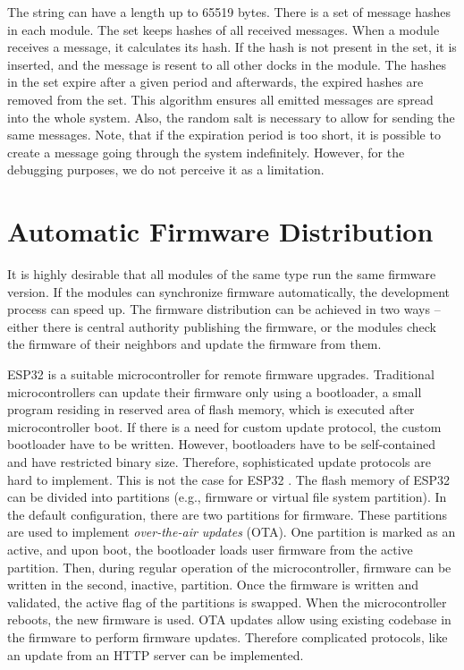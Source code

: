 \noindent The string can have a length up to 65519 bytes. There is a set of
message hashes in each module. The set keeps hashes of all received messages.
When a module receives a message, it calculates its hash. If the hash is not
present in the set, it is inserted, and the message is resent to all other docks
in the module. The hashes in the set expire after a given period and afterwards,
the expired hashes are removed from the set. This algorithm ensures all emitted
messages are spread into the whole system. Also, the random salt is necessary to
allow for sending the same messages. Note, that if the expiration period is too
short, it is possible to create a message going through the system indefinitely.
However, for the debugging purposes, we do not perceive it as a limitation.

\section{Automatic Firmware Distribution} \label{sec:firmware_distribution}

It is highly desirable that all modules of the same type run the same firmware
version. If the modules can synchronize firmware automatically, the development
process can speed up. The firmware distribution can be achieved in two ways --
either there is central authority publishing the firmware, or the modules check
the firmware of their neighbors and update the firmware from them.

ESP32 is a suitable microcontroller for remote firmware upgrades. Traditional
microcontrollers can update their firmware only using a bootloader, a small
program residing in reserved area of flash memory, which is executed after
microcontroller boot. If there is a need for custom update protocol, the custom
bootloader have to be written. However, bootloaders have to be self-contained
and have restricted binary size. Therefore, sophisticated update protocols are
hard to implement. This is not the case for ESP32
\cite{noauthor_esp-idf_nodate}. The flash memory of ESP32 can be divided into
partitions (e.g., firmware or virtual file system partition). In the default
configuration, there are two partitions for firmware. These partitions are used
to implement \emph{over-the-air updates} (OTA). One partition is marked as an
active, and upon boot, the bootloader loads user firmware from the active
partition. Then, during regular operation of the microcontroller, firmware can
be written in the second, inactive, partition. Once the firmware is written and
validated, the active flag of the partitions is swapped. When the
microcontroller reboots, the new firmware is used. OTA updates allow using
existing codebase in the firmware to perform firmware updates. Therefore
complicated protocols, like an update from an HTTP server can be implemented.


